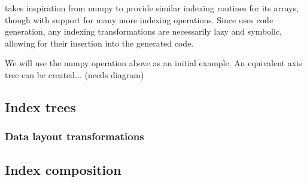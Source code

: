 \documentclass[thesis]{subfiles}
\begin{document}
 takes inspiration from numpy to provide similar indexing routines for its arrays, though with support for many more indexing operations.
Since  uses code generation, any indexing transformations are necessarily lazy and symbolic, allowing for their insertion into the generated code.

We will use the numpy operation above as an initial example.
An equivalent axis tree can be created... (needs diagram)



\subsection{Index trees}
\label{sec:index_trees}



\subsubsection{Data layout transformations}


\subsection{Index composition}
\label{sec:index_composition}
\end{document}
